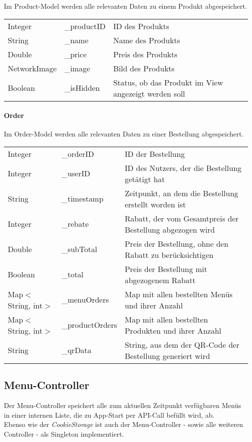 Im Product-Model werden alle relevanten Daten zu einem Produkt abgespeichert.

\begin{tabular}{l l l}
    Integer & \_productID & ID des Produkts\\
    String & \_name & Name des Produkts\\
    Double & \_price & Preis des Produkts\\
    NetworkImage & \_image & Bild des Produkts\\
    Boolean & \_isHidden & Status, ob das Produkt im View angezeigt werden soll
\end{tabular}
\pagebreak
\paragraph{Order}

Im Order-Model werden alle relevanten Daten zu einer Bestellung abgespeichert.

\begin{tabular}{l l l}
    Integer & \_orderID & ID der Bestellung\\
    Integer & \_userID & ID des Nutzers, der die Bestellung getätigt hat\\
    String & \_timestamp & Zeitpunkt, an dem die Bestellung erstellt worden ist\\
    Integer & \_rebate & Rabatt, der vom Gesamtpreis der Bestellung abgezogen wird\\
    Double & \_subTotal & Preis der Bestellung, ohne den Rabatt zu berücksichtigen\\
    Boolean & \_total & Preis der Bestellung mit abgezogenem Rabatt\\
    Map$<$String, int$>$ & \_menuOrders & Map mit allen bestellten Menüs und ihrer Anzahl\\
    Map$<$String, int$>$ & \_productOrders & Map mit allen bestellten Produkten und ihrer Anzahl\\
    String & \_qrData & String, aus dem der QR-Code der Bestellung generiert wird\\
\end{tabular}

\subsection{Menu-Controller}

Der Menu-Controller speichert alle zum aktuellen Zeitpunkt verfügbaren Menüs in einer internen Liste,
die zu App-Start per API-Call befüllt wird, ab.\\
Ebenso wie der \textit{CookieStorage} ist auch der Menu-Controller - sowie alle weiteren Controller -
als Singleton implementiert.

